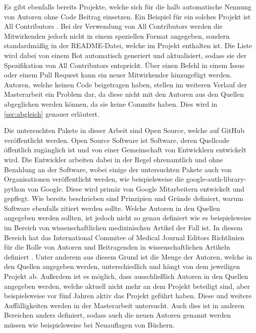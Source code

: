 Es gibt ebenfalls bereits Projekte, welche sich für die halb automatische Nennung von Autoren ohne Code Beitrag einsetzen.
Ein Beispiel für ein solches Projekt ist \glqq All Contributors\grqq{} \autocite{all_contributors_recognize_2024}.
Bei der Verwendung von \glqq All Contributors\grqq{} werden die Mitwirkenden jedoch nicht in einem speziellen Format angegeben, sondern standardmäßig in der README-Datei, welche im Projekt enthalten ist.
Die Liste wird dabei von einem Bot automatisch generiert und aktualisiert, sodass sie der Spezifikation von \glqq All Contributors\grqq{} entspricht.
Über einen Befehl in einem Issue oder einem Pull Request kann ein neuer Mitwirkender hinzugefügt werden.
Autoren, welche keinen Code beigetragen haben, stellen im weiteren Verlauf der Masterarbeit ein Problem dar, da diese nicht mit den Autoren aus den Quellen abgeglichen werden können, da sie keine Commits haben.
Dies wird in \autoref{sec:abgleich} genauer erläutert.

Die untersuchten Pakete in dieser Arbeit sind Open Source, welche auf GitHub veröffentlicht werden.
Open Source Software ist Software, deren Quellcode öffentlich zugänglich ist und von einer Gemeinschaft von Entwicklern entwickelt wird.
Die Entwickler arbeiten dabei in der Regel ehrenamtlich und ohne Bezahlung an der Software, wobei einige der untersuchten Pakete auch von Organisationen veröffentlicht werden, wie beispielsweise die \glqq google-auth-library-python
\grqq{} von Google.
Diese wird primär von Google Mitarbeitern entwickelt und gepflegt.
Wie bereits beschrieben sind Prinzipien und Gründe definiert, warum Software ebenfalls zitiert werden sollte.
Welche Autoren in den Quellen angegeben werden sollten, ist jedoch nicht so genau definiert wie es beispielsweise im Bereich von wissenschaftlichen medizinischen Artikel der Fall ist.
In diesem Bereich hat das \glqq International Commitee of Medical Journal Editors\grqq{} Richtlinien für die Rolle von Autoren und Beitragenden in wissenschaftlichen Artikeln definiert \autocite{noauthor_icmje_nodate}.
Unter anderem aus diesem Grund ist die Menge der Autoren, welche in den Quellen angegeben werden, unterschiedlich und hängt von dem jeweiligen Projekt ab.
Außerdem ist es möglich, dass ausschließlich Autoren in den Quellen angegeben werden, welche aktuell nicht mehr an dem Projekt beteiligt sind, aber beispielsweise vor fünf Jahren aktiv das Projekt geführt haben.
Diese und weitere Auffälligkeiten werden in der Masterarbeit untersucht.
Auch dies ist in anderen Bereichen anders definiert, sodass auch die neuen Autoren genannt werden müssen wie beispielsweise bei Neuauflagen von Büchern.
